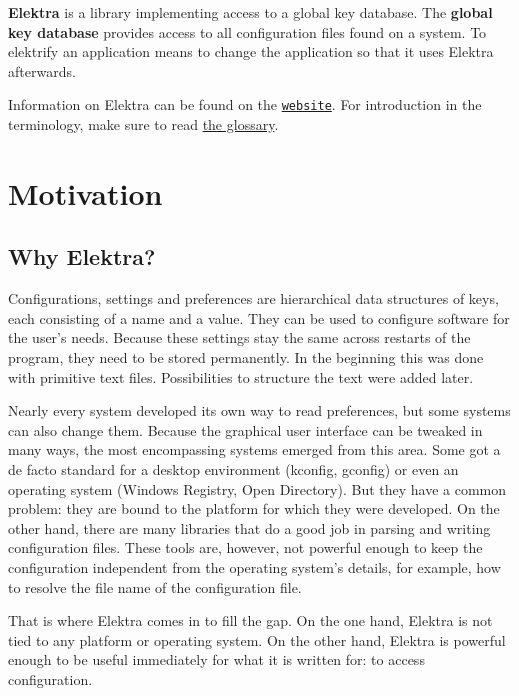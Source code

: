 {\bfseries Elektra} is a library implementing access to a global key database. The {\bfseries global key database} provides access to all configuration files found on a system. To elektrify an application means to change the application so that it uses Elektra afterwards.

Information on Elektra can be found on the \href{http://www.libelektra.org}{\tt website}. For introduction in the terminology, make sure to read \hyperlink{md_doc_help_elektra-glossary_doc_help_elektra-glossary_md}{the glossary}.\hypertarget{md_doc_help_elektra-introduction_doc_help_elektra-introduction_md}{}\section{Motivation}\label{md_doc_help_elektra-introduction_doc_help_elektra-introduction_md}
\subsection*{Why Elektra?}

Configurations, settings and preferences are hierarchical data structures of keys, each consisting of a name and a value. They can be used to configure software for the user's needs. Because these settings stay the same across restarts of the program, they need to be stored permanently. In the beginning this was done with primitive text files. Possibilities to structure the text were added later.

Nearly every system developed its own way to read preferences, but some systems can also change them. Because the graphical user interface can be tweaked in many ways, the most encompassing systems emerged from this area. Some got a de facto standard for a desktop environment (kconfig, gconfig) or even an operating system (Windows Registry, Open Directory). But they have a common problem\+: they are bound to the platform for which they were developed. On the other hand, there are many libraries that do a good job in parsing and writing configuration files. These tools are, however, not powerful enough to keep the configuration independent from the operating system's details, for example, how to resolve the file name of the configuration file.

That is where Elektra comes in to fill the gap. On the one hand, Elektra is not tied to any platform or operating system. On the other hand, Elektra is powerful enough to be useful immediately for what it is written for\+: to access configuration.


